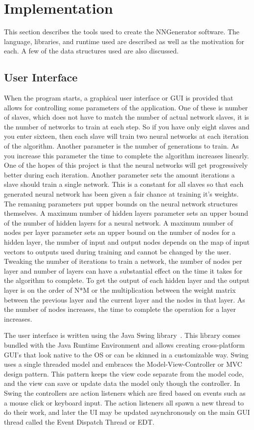 \chapter[Implementation]{Implementation}
This section describes the tools used to create the NNGenerator software. The language, libraries, and runtime used are described as well as the motivation for each. A few of the data structures used are also discussed.



\section{User Interface}
When the program starts, a graphical user interface or GUI is provided that allows for controlling some parameters of the application. One of these is number of slaves, which does not have to match the number of actual network slaves, it is the number of networks to train at each step. So if you have only eight slaves and you enter sixteen, then each slave will train two neural networks at each iteration of the algorithm. Another parameter is the number of generations to train. As you increase this parameter the time to complete the algorithm increases linearly. One of the hopes of this project is that the neural networks will get progressively better during each iteration. Another parameter sets the amount iterations a slave should train a single network. This is a constant for all slaves so that each generated neural network has been given a fair chance at training it's weights. The remaning parameters put upper bounds on the neural network structures themselves. A maximum number of hidden layers parameter sets an upper bound of the number of hidden layers for a neural network. A maximum number of nodes per layer parameter sets an upper bound on the number of nodes for a hidden layer, the number of input and output nodes depends on the map of input vectors to outputs used during training and cannot be changed by the user. Tweaking the number of iterations to train a network, the number of nodes per layer and number of layers can have a substantial effect on the time it takes for the algorithm to complete. To get the output of each hidden layer and the output layer is on the order of N*M or the multiplication between the weight matrix between the previous layer and the current layer and the nodes in that layer. As the number of nodes increases, the time to complete the operation for a layer increases.

The user interface is written using the Java Swing library~\cite{swing}. This library comes bundled with the Java Runtime Environment and allows creating cross-platform GUI's that look native to the OS or can be skinned in a customizable way. Swing uses a single threaded model and embraces the Model-View-Controller or MVC design pattern. This pattern keeps the view code separate from the model code, and the view can save or update data the model only though the controller. In Swing the controllers are action listeners which are fired based on events such as a mouse click or keyboard input. The action listeners all spawn a new thread to do their work, and later the UI may be updated asynchronously on the main GUI thread called the Event Dispatch Thread or EDT.

